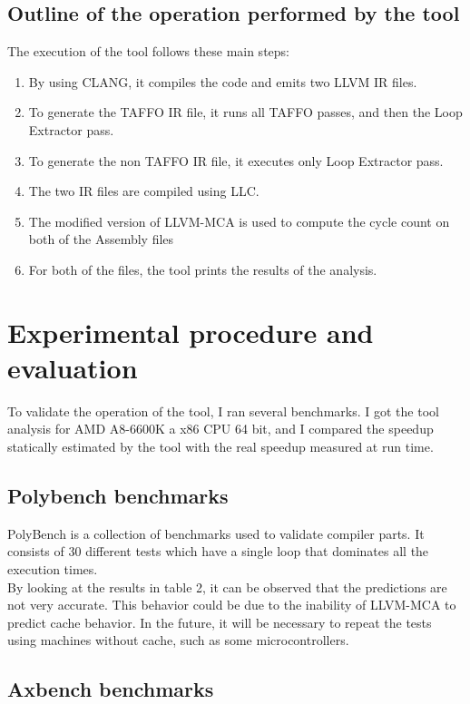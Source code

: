 \subsection{Outline of the operation performed by the tool}
The execution of the tool follows these main steps:
\begin{enumerate}
\item By using CLANG, it compiles the code and emits two LLVM IR files.
\item To generate the TAFFO IR file, it runs all TAFFO passes, and then the Loop Extractor pass.
\item To generate the non TAFFO IR file, it executes only Loop Extractor pass.
\item The two IR files are compiled using LLC.
\item The modified version of LLVM-MCA is used to compute the cycle count on both of the Assembly files
\item For both of the files, the tool prints the results of the analysis.
\end{enumerate}

\section{Experimental procedure and evaluation}
To validate the operation of the tool, I ran several benchmarks.
I got the tool analysis for AMD A8-6600K a x86 CPU 64 bit, and I compared the speedup statically estimated by the tool with the real speedup measured at run time.

\subsection{Polybench benchmarks}
PolyBench is a collection of benchmarks used to validate compiler parts. It consists of 30 different tests which have a single loop that dominates all the execution times. \\
By looking at the results in table 2, it can be observed that the predictions are not very accurate.
This behavior could be due to the inability of LLVM-MCA to predict cache behavior.
In the future, it will be necessary to repeat the tests using machines without cache, such as some microcontrollers.


\subsection{Axbench benchmarks}

